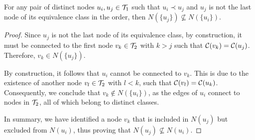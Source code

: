 \begin{lemma} \label{lemma:distinct_neighborhoods_2}
    For any pair of distinct nodes $u_i, u_j \in \mathcal{T}_{1}$ such that $u_i \prec u_j$ and $u_j$ is not the last node of its equivalence class in the order, then $N(\{u_j\}) \not\subseteq N(\{u_i\})$.
\end{lemma}
\begin{proof}
    Since $u_j$ is not the last node of its equivalence class, by construction, it must be connected to the first node $v_k \in \mathcal{T}_{2}$ with $k > j$ such that $\mathcal{C}(v_k) = \mathcal{C}(u_j)$. Therefore, $v_k \in N(\{u_j\})$.

    By construction, it follows that $u_i$ cannot be connected to $v_k$. This is due to the existence of another node $v_l \in \mathcal{T}_{2}$ with $l < k$, such that $\mathcal{C}(v_l) = \mathcal{C}(u_k)$. Consequently, we conclude that $v_k \notin N(\{u_i\})$, as the edges of $u_i$ connect to nodes in $\mathcal{T}_{2}$, all of which belong to distinct classes.

    In summary, we have identified a node $v_k$ that is included in $N({u_j})$ but excluded from $N({u_i})$, thus proving that $N({u_j}) \not\subseteq N({u_i})$.
\end{proof}

 
\begin{comment}
\begin{claim} \label{claim:prev_not_subset}
    For any pair of distinct nodes $u_i, u_j \in \treeset{1}$ with $i < j$, then we have that $N(\{u_i\}) \not\subseteq N(\{u_j\})$.
\end{claim}
\begin{proof}
    This is a direct consequence of the proof of \cref{lemma:distinct_neighborhoods}. In its proof, we showed that for any pair of nodes $u_i, u_j$ with $i < j$, there exists a neighbor $v_k \in N(\{u_i\})$ such that $k \leq j$. By \cref{lemma:greater_nodes}, any neighbor of $u_j$ must have an index greater than $j$. Therefore, $v_k$ cannot be a neighbor of $u_j$, which implies that $N(\{u_i\})$ cannot be a subset of $N(\{u_j\})$.
\end{proof}
\end{comment}

